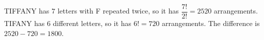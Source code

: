 TIFFANY has $7$ letters with F repeated twice, so it has $\dfrac{7!}{2!}=2520$ arrangements. TIFANY has $6$ different letters, so it has $6!=720$ arrangements. The difference is $2520-720=\boxed{1800}$.
